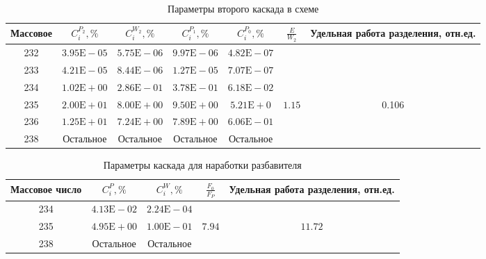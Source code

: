\begin{table}
\begin{tabular}{|c|c|c|c|c|c|c|}
    \hline Массовое & $C_{i}^{P_{2}}, \%$ & $C_{i}^{W_{2}}, \%$ & $C_{i}^{P_{1}}, \%$ & $C_{i}^{P_{0}}, \%$ & $\frac{E}{W_{2}}$ & Удельная работа разделения, отн.ед. \\
    \hline 232 & $3.95 \mathrm{E}-05$ & $5.75 \mathrm{E}-06$ & $9.97 \mathrm{E}-06$ & $4.82 \mathrm{E}-07$ & & \\
    233 & $4.21 \mathrm{E}-05$ & $8.44 \mathrm{E}-06$ & $1.27 \mathrm{E}-05$ & $7.07 \mathrm{E}-07$ & & \\
    234 & $1.02 \mathrm{E}+00$ & $2.86 \mathrm{E}-01$ & $3.78 \mathrm{E}-01$ & $6.18 \mathrm{E}-02$ & & \\
    235 & $2.00 \mathrm{E}+01$ & $8.00 \mathrm{E}+00$ & $9.50 \mathrm{E}+00$ & $5.21 \mathrm{E}+0$ & $1.15$ & 0.106 \\
    236 & $1.25 \mathrm{E}+01$ & $7.24 \mathrm{E}+00$ & $7.89 \mathrm{E}+00$ & $6.06 \mathrm{E}-01$ & & \\
    238 & Остальное & Остальное & Остальное & Остальное & & \\
    \hline
\end{tabular}
\caption{Параметры второго каскада в схеме}\label{MDKcas2params}
\end{table}

\begin{table}
\begin{tabular}{|c|c|c|c|c|}
    \hline Массовое число & $C_{i}^{P}, \%$ & $C_{i}^{W}, \%$ & $\frac{F_{0}}{F_{P}}$ &  Удельная работа разделения, отн.ед. \\
    \hline 234 & $4.13 \mathrm{E}-02$ & $2.24 \mathrm{E}-04$ & \\
    235 & $4.95 \mathrm{E}+00$ & $1.00 \mathrm{E}-01$ & $7.94$ & $11.72$ \\
    238 & Остальное & Остальное & & \\
    \hline
\end{tabular}
\caption{Параметры каскада для наработки разбавителя}\label{MDKcas0params}
\end{table}
    

